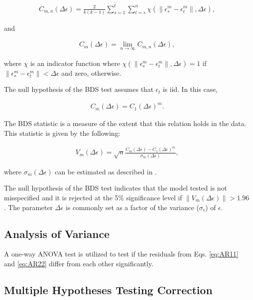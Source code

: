 \documentclass[]{book}
\theoremstyle{definition}
\theoremstyle{definition}
\theoremstyle{definition}
\theoremstyle{remark}
\begin{document}
\begin{align}
C_{m,n}(\Delta \epsilon) = \frac{2}{k(k-1)}\sum_{s = 1}^{t}{\sum_{t=s}^{n}{ \chi(\| \epsilon_s^m - \epsilon_t^m \|, \Delta \epsilon)    }}, \nonumber
\end{align}

and

\begin{align}
C_{m}(\Delta \epsilon) = \lim_{n\to\infty} C_{m,n}(\Delta \epsilon), \nonumber
\end{align}

where \(\chi\) is an indicator function where
\(\chi(\| \epsilon_s^m - \epsilon_t^m \|, \Delta \epsilon) = 1\) if
\(\| \epsilon_s^m - \epsilon_t^m \| < \Delta \epsilon\) and zero,
otherwise.

The null hypothesis of the BDS test assumes that \(\epsilon_t\) is iid.
In this case,

\begin{align}
C_{m}(\Delta \epsilon) = C_{1}(\Delta \epsilon)^m. \nonumber
\end{align}

The BDS statistic is a measure of the extent that this relation holds in
the data. This statistic is given by the following:

\begin{align}
V_{m}(\Delta \epsilon) = \sqrt{n}\frac{C_{m}(\Delta \epsilon) - C_{1}(\Delta \epsilon)^m}{\sigma_m(\Delta \epsilon)}, \nonumber
\end{align}

where \(\sigma_m(\Delta \epsilon)\) can be estimated as described in
\citep{citeulike:9300127}.

The null hypothesis of the BDS test indicates that the model tested is
not misspecified and it is rejected at the 5\% significance level if
\(\|V_m(\Delta \epsilon)\| > 1.96\). The parameter \(\Delta \epsilon\)
is commonly set as a factor of the variance (\(\sigma_\epsilon\)) of
\(\epsilon\).

\subsection{Analysis of Variance}\label{analysis-of-variance}

A one-way ANOVA test is utilized to test if the residuals from Eqs.
\eqref{eq:AR11} and \eqref{eq:AR22} differ from each other significantly.

\subsection{Multiple Hypotheses Testing
Correction}\label{multiple-hypotheses-testing-correction}
\end{document}
